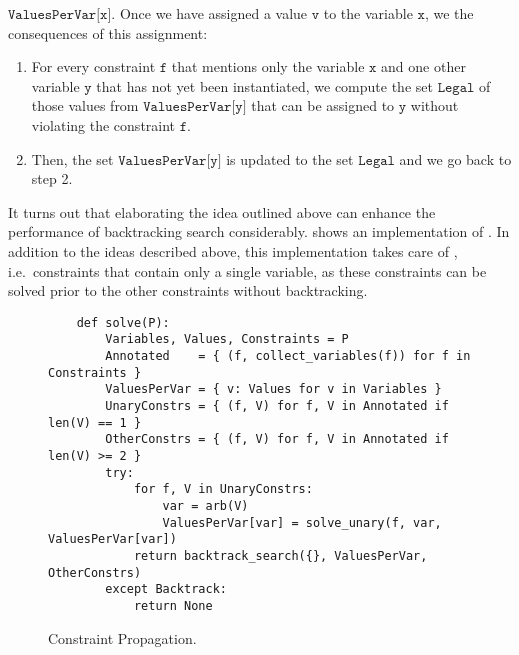 \begin{enumerate}
      $\texttt{ValuesPerVar[x]}$.  Once we have assigned a value $\texttt{v}$ to the variable $\texttt{x}$, we 
       the consequences of this assignment: 
      \begin{enumerate}
      \item For every constraint $\texttt{f}$ that mentions only the variable $\texttt{x}$ and one other variable
            $\texttt{y}$ that has not yet been instantiated, we compute the set $\texttt{Legal}$ of those values from 
            $\texttt{ValuesPerVar[y]}$ that can be assigned to $\texttt{y}$ without violating the constraint
            $\texttt{f}$.
            
      \item Then, the set $\texttt{ValuesPerVar[y]}$ is updated to the set $\texttt{Legal}$ and we go back to
            step 2.
      \end{enumerate}
\end{enumerate}
It turns out that elaborating the idea outlined above can enhance the performance of backtracking search
considerably.   shows an implementation of 
.  In addition to the ideas described above, this implementation takes care of
, i.e.~constraints that contain only a single variable, as these constraints can be
solved prior to the other constraints without backtracking.


\begin{figure}[!ht]
\centering
\begin{verbatim}
    def solve(P):
        Variables, Values, Constraints = P
        Annotated    = { (f, collect_variables(f)) for f in Constraints }
        ValuesPerVar = { v: Values for v in Variables }
        UnaryConstrs = { (f, V) for f, V in Annotated if len(V) == 1 }
        OtherConstrs = { (f, V) for f, V in Annotated if len(V) >= 2 }
        try:
            for f, V in UnaryConstrs:
                var = arb(V)
                ValuesPerVar[var] = solve_unary(f, var, ValuesPerVar[var])
            return backtrack_search({}, ValuesPerVar, OtherConstrs)
        except Backtrack:
            return None
\end{verbatim}
\vspace*{-0.3cm}
\caption{Constraint Propagation.}
\label{fig:Constraint-Propagation-Solver.ipynb:solve}
\end{figure}

